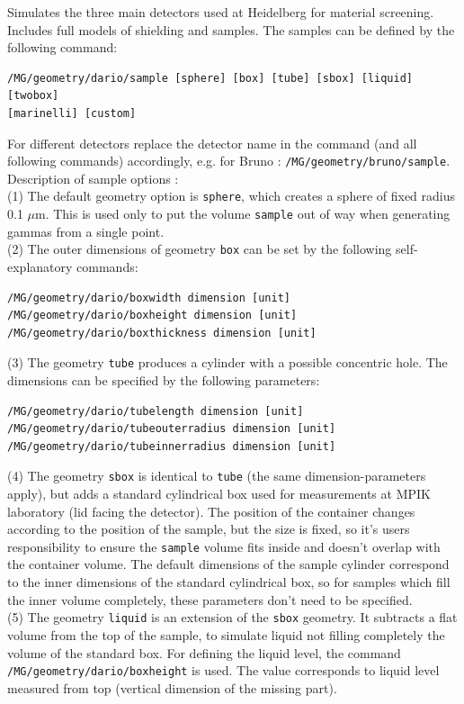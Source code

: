 Simulates the three main detectors used at Heidelberg for material screening.
Includes full models of shielding and samples. The samples can be defined
by the following command:
\begin{lstlisting}
/MG/geometry/dario/sample [sphere] [box] [tube] [sbox] [liquid] [twobox]
[marinelli] [custom]
\end{lstlisting}
For different detectors replace the detector name in the command (and all following commands) accordingly, e.g. for Bruno : \texttt{/MG/geometry/bruno/sample}.\\
Description of sample options :\\
(1) The default geometry option is \texttt{sphere}, which creates a sphere of fixed radius 0.1 $\mu$m. This is used only to put the volume \texttt{sample} out of way when generating gammas from a single point.\\
(2) The outer dimensions of geometry \texttt{box} can be set by the following self-explanatory commands:
\begin{lstlisting}
/MG/geometry/dario/boxwidth dimension [unit]
/MG/geometry/dario/boxheight dimension [unit]
/MG/geometry/dario/boxthickness dimension [unit]
\end{lstlisting}
(3) The geometry \texttt{tube} produces a cylinder with a possible concentric hole. The dimensions can be specified by the following parameters:
\begin{lstlisting}
/MG/geometry/dario/tubelength dimension [unit]
/MG/geometry/dario/tubeouterradius dimension [unit]
/MG/geometry/dario/tubeinnerradius dimension [unit]
\end{lstlisting}
(4) The geometry \texttt{sbox} is identical to \texttt{tube} (the same dimension-parameters apply), but adds a standard cylindrical
box used for measurements at MPIK laboratory (lid facing the detector). The position of the container changes according to the position of the sample, but the size is fixed, so it's users responsibility to ensure the \texttt{sample} volume fits inside and doesn't overlap with the container volume. The default dimensions of the sample cylinder correspond to the inner dimensions of the standard cylindrical box, so for samples which fill the inner volume completely, these parameters don't need to be specified.\\
(5) The geometry \texttt{liquid} is an extension of the \texttt{sbox} geometry. It subtracts a flat volume from the top of the sample, to simulate liquid not filling completely the volume of the standard box. For defining the liquid level, the command \texttt{/MG/geometry/dario/boxheight} is used. The value corresponds to liquid level measured from top (vertical dimension of the missing part).\\
